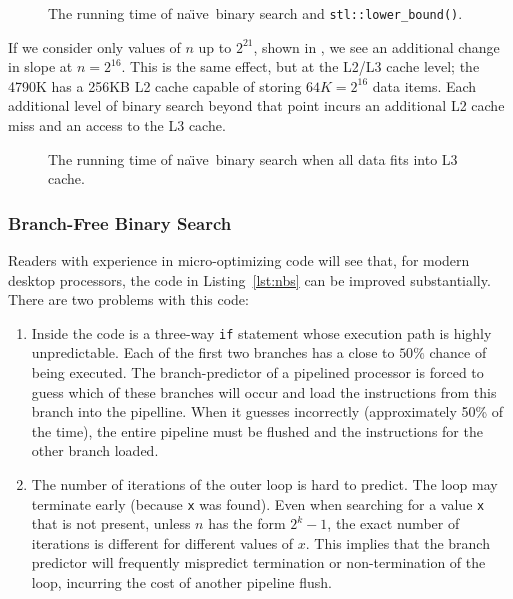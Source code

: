 \documentclass{patmorin}
\newcommand{\lstref}[1]{Listing~\ref{lst:#1}}
\newcommand{\naive}{na\"{\i}ve}
\begin{document}
\begin{figure}
   \caption{The running time of \naive\ binary search and 
            \texttt{stl::lower_bound()}.}
\end{figure}

If we consider only values of $n$ up to $2^{21}$, shown in
, we see an additional change in slope at
$n=2^{16}$.  This is the same effect, but at the L2/L3 cache level; the
4790K has a 256KB L2 cache capable of storing $64K=2^{16}$ data items.
Each additional level of binary search beyond that point incurs an
additional L2 cache miss and an access to the L3 cache.

\begin{figure}
   \caption{The running time of \naive\ binary search when all data
    fits into L3 cache.}
\end{figure}


\subsubsection{Branch-Free Binary Search}

Readers with experience in micro-optimizing code will see that, for
modern desktop processors, the code in \lstref{nbs} can be improved
substantially.  There are two problems with this code:

\begin{enumerate}

\item Inside the code is a three-way \texttt{if} statement whose
execution path is highly unpredictable. Each of the first two branches
has a close to $50\%$ chance of being executed.  The branch-predictor of
a pipelined processor is forced to guess which of these branches will
occur and load the instructions from this branch into the pipelline.
When it guesses incorrectly (approximately 50\% of the time), the entire
pipeline must be flushed and the instructions for the other branch loaded.

\item The number of iterations of the outer loop is hard to predict. The
loop may terminate early (because \texttt{x} was found). Even when
searching for a value \texttt{x} that is not present, unless $n$ has
the form $2^k-1$, the exact number of iterations is different for different
values of $x$.  This implies that the branch predictor will frequently
mispredict termination or non-termination of the loop, incurring the
cost of another pipeline flush.

\end{enumerate}
\end{document}

